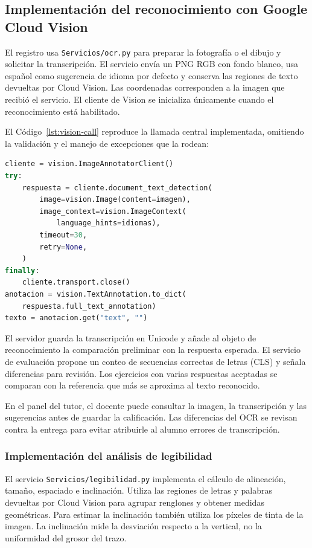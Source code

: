\subsection{Implementación del reconocimiento con Google Cloud Vision}
\label{sec:vision-implementacion}
El registro usa \texttt{Servicios/ocr.py} para preparar la fotografía o el dibujo y solicitar la transcripción. El servicio envía un PNG RGB con fondo blanco, usa español como sugerencia de idioma por defecto y conserva las regiones de texto devueltas por Cloud Vision. Las coordenadas corresponden a la imagen que recibió el servicio. El cliente de Vision se inicializa únicamente cuando el reconocimiento está habilitado.

El Código~\ref{lst:vision-call} reproduce la llamada central implementada, omitiendo la validación y el manejo de excepciones que la rodean:
\begin{lstlisting}[language=Python, caption={Llamada implementada al servicio de reconocimiento}, label={lst:vision-call}]
cliente = vision.ImageAnnotatorClient()
try:
    respuesta = cliente.document_text_detection(
        image=vision.Image(content=imagen),
        image_context=vision.ImageContext(
            language_hints=idiomas),
        timeout=30,
        retry=None,
    )
finally:
    cliente.transport.close()
anotacion = vision.TextAnnotation.to_dict(
    respuesta.full_text_annotation)
texto = anotacion.get("text", "")
\end{lstlisting}

El servidor guarda la transcripción en Unicode y añade al objeto de reconocimiento la comparación preliminar con la respuesta esperada. El servicio de evaluación propone un conteo de secuencias correctas de letras (CLS) y señala diferencias para revisión. Los ejercicios con varias respuestas aceptadas se comparan con la referencia que más se aproxima al texto reconocido.

En el panel del tutor, el docente puede consultar la imagen, la transcripción y las sugerencias antes de guardar la calificación. Las diferencias del OCR se revisan contra la entrega para evitar atribuirle al alumno errores de transcripción.

\subsubsection{Implementación del análisis de legibilidad}
El servicio \texttt{Servicios/legibilidad.py} implementa el cálculo de alineación, tamaño, espaciado e inclinación. Utiliza las regiones de letras y palabras devueltas por Cloud Vision para agrupar renglones y obtener medidas geométricas. Para estimar la inclinación también utiliza los píxeles de tinta de la imagen. La inclinación mide la desviación respecto a la vertical, no la uniformidad del grosor del trazo.

